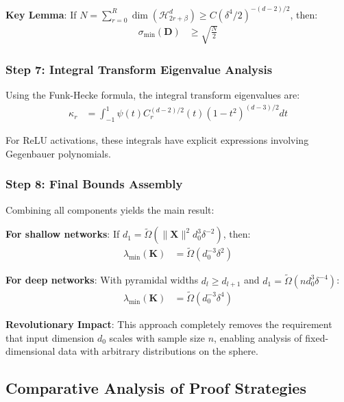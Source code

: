 \documentclass{article}
\begin{document}
\textbf{Key Lemma}: If $N = \sum_{r=0}^R \dim(\mathcal{H}_{2r+\beta}^d) \geq C(\delta^4/2)^{-(d-2)/2}$, then:
\begin{align}
    \sigma_{\min}(\mathbf{D}) &\geq \sqrt{\frac{N}{2}}
\end{align}

\subsubsection{Step 7: Integral Transform Eigenvalue Analysis}

Using the Funk-Hecke formula, the integral transform eigenvalues are:
\begin{align}
    \kappa_r &= \int_{-1}^1 \psi(t) C_r^{(d-2)/2}(t) (1-t^2)^{(d-3)/2} dt
\end{align}

For ReLU activations, these integrals have explicit expressions involving Gegenbauer polynomials.

\subsubsection{Step 8: Final Bounds Assembly}

Combining all components yields the main result:

\textbf{For shallow networks}: If $d_1 = \tilde{\Omega}(\|\mathbf{X}\|^2 d_0^3 \delta^{-2})$, then:
\begin{align}
    \lambda_{\min}(\mathbf{K}) &= \tilde{\Omega}(d_0^{-3}\delta^2)
\end{align}

\textbf{For deep networks}: With pyramidal widths $d_l \geq d_{l+1}$ and $d_1 = \tilde{\Omega}(n d_0^3 \delta^{-4})$:
\begin{align}
    \lambda_{\min}(\mathbf{K}) &= \tilde{\Omega}(d_0^{-3}\delta^4)
\end{align}

\textbf{Revolutionary Impact}: This approach completely removes the requirement that input dimension $d_0$ scales with sample size $n$, enabling analysis of fixed-dimensional data with arbitrary distributions on the sphere.

\subsection{Comparative Analysis of Proof Strategies}
\end{document}
